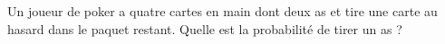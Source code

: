 
\begin{exercice}\label{exosmath-0281}

    Un joueur de poker a quatre cartes en main dont deux as et tire une carte au hasard dans le paquet restant. Quelle est la probabilité de tirer un as ?

\end{exercice}
